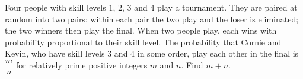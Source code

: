 Four people with skill levels $1$, $2$, $3$ and $4$ play a tournament. They are paired at random into two pairs; within each pair the two play and the loser is eliminated; the two winners then play the final. When two people play, each wins with probability proportional to their skill level. The probability that Cornie and Kevin, who have skill levels $3$ and $4$ in some order, play each other in the final is $\dfrac mn$ for relatively prime positive integers $m$ and $n$. Find $m+n$.
